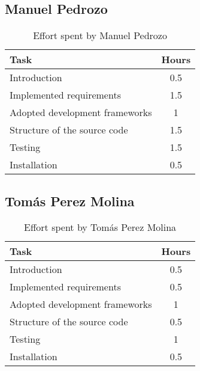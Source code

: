 \subsection{Manuel Pedrozo}

\begin{table}[H]
    \centering
    \begin{tabular}{|p{7cm}|c|}
    \hline
    \textbf{Task} & \textbf{Hours} \\ \hline
    Introduction & 0.5 \\ \hline
    Implemented requirements & 1.5 \\ \hline
    Adopted development frameworks & 1 \\ \hline
    Structure of the source code & 1.5 \\ \hline
    Testing & 1.5 \\ \hline
    Installation & 0.5 \\ \hline
    \end{tabular}
    \caption{\label{tbl:manuel-effort} Effort spent by Manuel Pedrozo}
    \end{table}

\subsection{Tomás Perez Molina}
\begin{table}[H]
    \centering
    \begin{tabular}{|p{7cm}|c|}
    \hline
    \textbf{Task} & \textbf{Hours} \\ \hline
    Introduction & 0.5 \\ \hline
    Implemented requirements & 0.5 \\ \hline
    Adopted development frameworks & 1 \\ \hline
    Structure of the source code & 0.5 \\ \hline
    Testing & 1 \\ \hline
    Installation & 0.5 \\ \hline
    \end{tabular}
    \caption{\label{tbl:tomas-effort} Effort spent by Tomás Perez Molina}
    \end{table}
